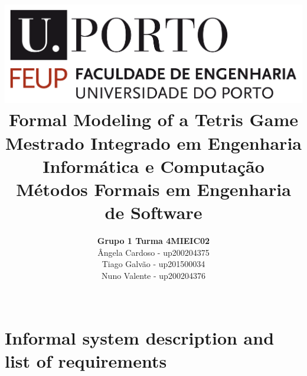 \documentclass[a4paper]{article}
\begin{document}
\setlength{\textwidth}{16cm}
\setlength{\textheight}{22cm}


\title{\includegraphics[scale=0.15]{resources/img/feup-logo.png}
\linebreak\linebreak\linebreak\linebreak\linebreak
\Huge\textbf{Formal Modeling of a Tetris Game }\linebreak\linebreak
\linebreak\linebreak
\Large{Mestrado Integrado em Engenharia Informática e Computação} \linebreak\linebreak
\Large{Métodos Formais em Engenharia de Software}\linebreak\linebreak
}
\author{\textbf{Grupo 1 Turma 4MIEIC02}\\
Ângela Cardoso - up200204375\\
Tiago Galvão - up201500034\\
Nuno Valente - up200204376\\
\linebreak\linebreak \\
\linebreak\linebreak\linebreak
\linebreak\linebreak\vspace{1cm}}

\maketitle

\thispagestyle{empty}
\newpage
\tableofcontents
\newpage

\section{Informal system description and list of requirements}
\end{document}
